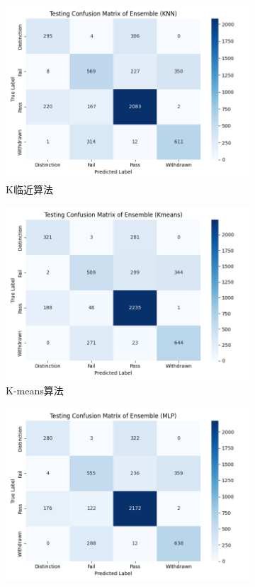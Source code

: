 \documentclass[a4paper, utf8]{ctexart}
\begin{document}
\begin{figure}
		\begin{subfigure}{.32\textwidth}
			\centering
			\includegraphics[width=\textwidth]{./figure/test_ensem_knn.png}
			\caption{K临近算法}
		\end{subfigure}
		\begin{subfigure}{.32\textwidth}
			\centering
			\includegraphics[width=\textwidth]{./figure/test_ensem_kmeans.png}
			\caption{K-means算法}
		\end{subfigure}
		\begin{subfigure}{.32\textwidth}
			\centering
			\includegraphics[width=\textwidth]{./figure/test_ensem_mlp.png}

\end{subfigure}
\end{figure}
\end{document}
